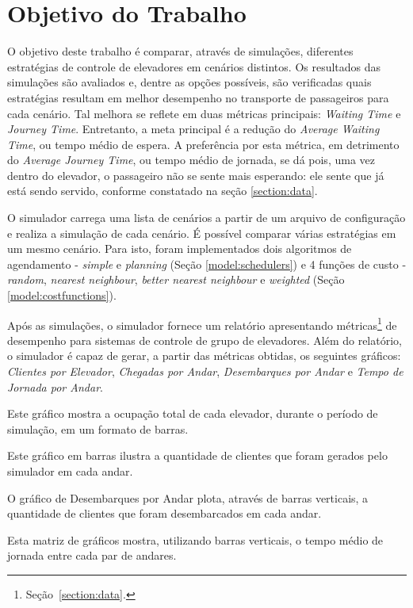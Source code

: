 \chapter{\label{chap:objectives}Objetivo do Trabalho}

O objetivo deste trabalho é comparar, através de simulações, diferentes
estratégias de controle de elevadores em cenários distintos. Os resultados das
simulações são avaliados e, dentre as opções possíveis, são verificadas quais
estratégias resultam em melhor desempenho no transporte de passageiros para cada
cenário. Tal melhora se reflete em duas métricas principais: \textit{Waiting
Time} e \textit{Journey Time}. Entretanto, a meta principal é a redução do
\textit{Average Waiting Time}, ou tempo médio de espera. A preferência por esta
métrica, em detrimento do \textit{Average Journey Time}, ou tempo médio de
jornada, se dá pois, uma vez dentro do elevador, o passageiro não se sente mais
esperando: ele sente que já está sendo servido, conforme constatado na seção
\ref{section:data}.

O simulador carrega uma lista de cenários a partir de um arquivo de configuração
e realiza a simulação de cada cenário. É possível comparar várias estratégias em
um mesmo cenário. Para isto, foram implementados dois algoritmos de agendamento
- \textit{simple} e \textit{planning} (Seção \ref{model:schedulers}) e 4 funções
de custo - \textit{random}, \textit{nearest neighbour}, \textit{better nearest
neighbour} e \textit{weighted} (Seção \ref{model:costfunctions}).

Após as simulações, o simulador fornece um relatório apresentando
métricas\footnote{Seção~\ref{section:data}.} de desempenho para sistemas de
controle de grupo de elevadores. Além do relatório, o simulador é capaz de
gerar, a partir das métricas obtidas, os seguintes gráficos: \textit{Clientes
por Elevador}, \textit{Chegadas por Andar}, \textit{Desembarques por Andar} e
\textit{Tempo de Jornada por Andar}.


\begin{description}[leftmargin=!,labelwidth=\widthof{\bfseries Tempo de Jornada por Andar}]
  \item[Clientes por Elevador]
    Este gráfico mostra a ocupação total de cada elevador, durante o período de
    simulação, em um formato de barras.
  \item[Chegadas por Andar]
    Este gráfico em barras ilustra a quantidade de clientes que foram gerados pelo
    simulador em cada andar.
  \item[Desembarques por Andar]
    O gráfico de Desembarques por Andar plota, através de barras verticais, a
    quantidade de clientes que foram desembarcados em cada andar.
  \item[Tempo de Jornada por Andar]
    Esta matriz de gráficos mostra, utilizando barras verticais, o tempo médio de
    jornada entre cada par de andares.
\end{description}

